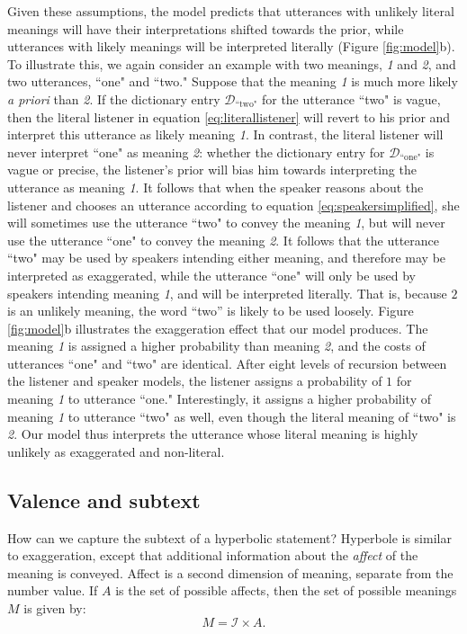 \documentclass{article} %
\newcommand{\dictionary}{\ensuremath{\mathcal{D}}\xspace}
\begin{document}
Given these assumptions, the model predicts that utterances with unlikely literal meanings will have their interpretations shifted towards the prior, while utterances with likely meanings will be interpreted literally (Figure \ref{fig:model}b). To illustrate this, we again consider an example with two meanings, \emph{1} and \emph{2}, and two utterances, ``one" and ``two." Suppose that the meaning \emph{1} is much more likely \emph{a priori} than \emph{2}. If the dictionary entry $\dictionary_{\text{``two"}}$ for the utterance ``two" is vague, then the literal listener in equation \ref{eq:literallistener} will revert to his prior and interpret this utterance as likely meaning \emph{1}. In contrast, the literal listener will never interpret ``one" as meaning \emph{2}: whether the dictionary entry for $\dictionary_{\text{``one"}}$ is vague or precise, the listener's prior will bias him towards interpreting the utterance as meaning \emph{1}. It follows that when the speaker reasons about the listener and chooses an utterance according to equation \ref{eq:speakersimplified}, she will sometimes use the utterance ``two" to convey the meaning \emph{1}, but will never use the utterance ``one" to convey the meaning \emph{2}. It follows that the utterance ``two" may be used by speakers intending either meaning, and therefore may be interpreted as exaggerated, while the utterance ``one" will only be used by speakers intending meaning \emph{1}, and will be interpreted literally. That is, because $2$ is an unlikely meaning, the word ``two'' is likely to be used loosely. Figure \ref{fig:model}b illustrates the exaggeration effect that our model produces. The meaning \emph{1} is assigned a higher probability than meaning \emph{2}, and the costs of utterances ``one" and ``two" are identical. After eight levels of recursion between the listener and speaker models, the listener assigns a probability of $1$ for meaning \emph{1} to utterance ``one." Interestingly, it assigns a higher probability of meaning \emph{1} to utterance ``two" as well, even though the literal meaning of ``two" is \emph{2}. Our model thus interprets the utterance whose literal meaning is highly unlikely as exaggerated and non-literal.

\subsection{Valence and subtext}

How can we capture the subtext of a hyperbolic statement? Hyperbole is similar to exaggeration, except that additional information about the \emph{affect} of the meaning is conveyed. Affect is a second dimension of meaning, separate from the number value. If $A$ is the set of possible affects, then the set of possible meanings $M$ is given by:
\begin{equation}
M = {\mathcal I} \times A.
\end{equation}
\end{document}
